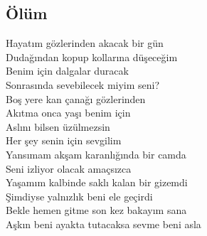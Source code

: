 \subsection{Ölüm}

Hayatım gözlerinden akacak bir gün \\
Dudağından kopup kollarına düşeceğim \\
Benim için dalgalar duracak \\
Sonrasında sevebilecek miyim seni? \\

\noindent\newline
Boş yere kan çanağı gözlerinden \\
Akıtma onca yaşı benim için \\
Aslını bilsen üzülmezsin \\
Her şey senin için sevgilim \\

\noindent\newline
Yansımam akşam karanlığında bir camda \\
Seni izliyor olacak amaçsızca \\
Yaşamım kalbinde saklı kalan bir gizemdi \\
Şimdiyse yalnızlık beni ele geçirdi \\

\noindent\newline
Bekle hemen gitme son kez bakayım sana \\
Aşkın beni ayakta tutacaksa sevme beni asla \\
